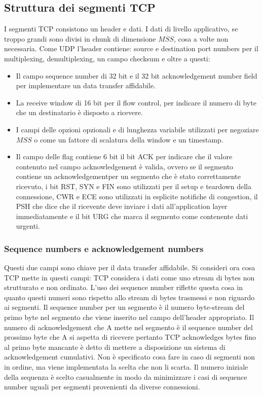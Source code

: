 \subsection{Struttura dei segmenti TCP}
I segmenti TCP consistono un header e dati. I dati di livello applicativo, se troppo grandi sono divisi in chunk di dimensione $MSS$, cosa a volte non 
necessaria. Come UDP l'header contiene: source e destination port numbers per il multiplexing, demultiplexing, un campo checksum e oltre a questi:
\begin{itemize}
\item Il campo sequence number di 32 bit e il 32 bit acknowledgement number field per implementare un data transfer affidabile.
\item La receive window di 16 bit per il flow control, per indicare il numero di byte che un destinatario \`e disposto a ricevere.
\item I campi delle opzioni opzionali e di lunghezza variabile utilizzati per negoziare $MSS$ o come un fattore di scalatura della window e un timestamp.
\item Il campo delle flag contiene 6 bit il bit ACK per indicare che il valore contenuto nel campo acknowledgement \`e valida, ovvero se il segmento 
contiene un acknowledgementper un segmento che \`e stato correttamente ricevuto, i bit RST, SYN e FIN sono utilizzati per il setup e teardown della 
connessione, CWR e ECE sono utilizzati in esplicite notifiche di congestion, il PSH che dice che il ricevente deve inviare i dati all'application layer
immediatamente e il bit URG che marca il segmento come contenente dati urgenti.  
\end{itemize}
\subsubsection{Sequence numbers e acknowledgement numbers}
Questi due campi sono chiave per il data transfer affidabile. Si consideri ora cosa TCP mette in questi campi: TCP considera i dati come uno stream di bytes 
non strutturato e non ordinato. L'uso dei sequence number riflette questa cosa in quanto questi numeri sono rispetto allo stream di bytes trasmessi e non
riguardo ai segmenti. Il sequence number per un segmento \`e il numero byte-stream del primo byte nel segmento che viene inserito nel campo dell'header
appropriato. Il numero di acknowledgement che A mette nel segmento \`e il sequence number del prossimo byte che A si aspetta di ricevere pertanto TCP 
acknowledges bytes fino al primo byte mancante \`e detto di mettere a disposizione un sistema di acknowledgement cumulativi. Non \`e specificato cosa
fare in caso di segmenti non in ordine, ma viene implementata la scelta che non li scarta. Il numero iniziale della sequenza \`e scelto casualmente in modo
da minimizzare i casi di sequence number uguali per segmenti provenienti da diverse connessioni. 
